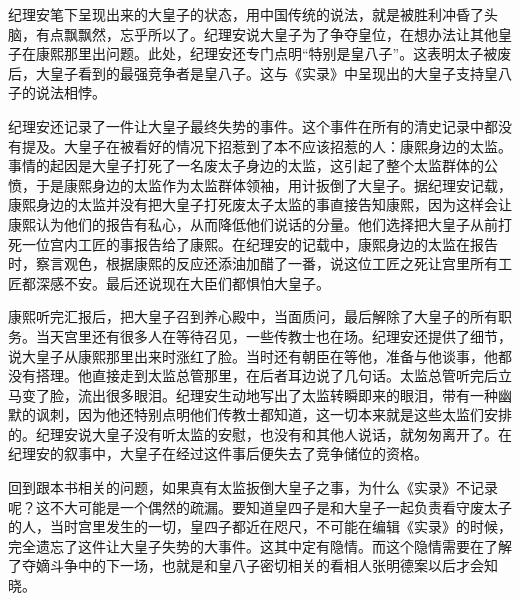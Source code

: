 
纪理安笔下呈现出来的大皇子的状态，用中国传统的说法，就是被胜利冲昏了头脑，有点飘飘然，忘乎所以了。纪理安说大皇子为了争夺皇位，在想办法让其他皇子在康熙那里出问题。此处，纪理安还专门点明“特别是皇八子”。这表明太子被废后，大皇子看到的最强竞争者是皇八子。这与《实录》中呈现出的大皇子支持皇八子的说法相悖。

纪理安还记录了一件让大皇子最终失势的事件。这个事件在所有的清史记录中都没有提及。大皇子在被看好的情况下招惹到了本不应该招惹的人：康熙身边的太监。事情的起因是大皇子打死了一名废太子身边的太监，这引起了整个太监群体的公愤，于是康熙身边的太监作为太监群体领袖，用计扳倒了大皇子。据纪理安记载，康熙身边的太监并没有把大皇子打死废太子太监的事直接告知康熙，因为这样会让康熙认为他们的报告有私心，从而降低他们说话的分量。他们选择把大皇子从前打死一位宫内工匠的事报告给了康熙。在纪理安的记载中，康熙身边的太监在报告时，察言观色，根据康熙的反应还添油加醋了一番，说这位工匠之死让宫里所有工匠都深感不安。最后还说现在大臣们都惧怕大皇子。



康熙听完汇报后，把大皇子召到养心殿中，当面质问，最后解除了大皇子的所有职务。当天宫里还有很多人在等待召见，一些传教士也在场。纪理安还提供了细节，说大皇子从康熙那里出来时涨红了脸。当时还有朝臣在等他，准备与他谈事，他都没有搭理。他直接走到太监总管那里，在后者耳边说了几句话。太监总管听完后立马变了脸，流出很多眼泪。纪理安生动地写出了太监转瞬即来的眼泪，带有一种幽默的讽刺，因为他还特别点明他们传教士都知道，这一切本来就是这些太监们安排的。纪理安说大皇子没有听太监的安慰，也没有和其他人说话，就匆匆离开了。在纪理安的叙事中，大皇子在经过这件事后便失去了竞争储位的资格。



回到跟本书相关的问题，如果真有太监扳倒大皇子之事，为什么《实录》不记录呢？这不大可能是一个偶然的疏漏。要知道皇四子是和大皇子一起负责看守废太子的人，当时宫里发生的一切，皇四子都近在咫尺，不可能在编辑《实录》的时候，完全遗忘了这件让大皇子失势的大事件。这其中定有隐情。而这个隐情需要在了解了夺嫡斗争中的下一场，也就是和皇八子密切相关的看相人张明德案以后才会知晓。


